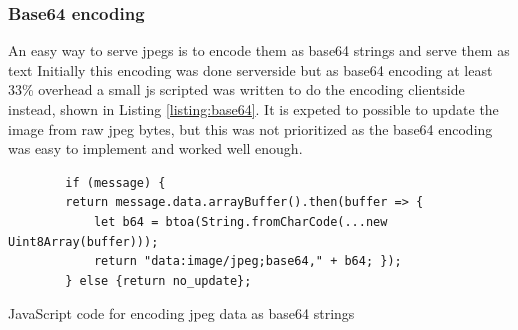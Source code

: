 \subsubsection{Base64 encoding}
An easy way to serve \glspl{jpeg} is to encode them as base64 strings and serve them as text \cite{rAnswerHowDisplay2013}
Initially this encoding was done serverside but as base64 encoding at least 33\% overhead a small \gls{js} scripted was written to do the encoding clientside instead, shown in Listing \ref{listing:base64}.
It is expeted to possible to update the image from raw \gls{jpeg} bytes, but this was not prioritized as the base64 encoding was easy to implement and worked well enough.
\begin{listing}[H]
    \begin{verbatim}
        if (message) {
        return message.data.arrayBuffer().then(buffer => {
            let b64 = btoa(String.fromCharCode(...new Uint8Array(buffer)));
            return "data:image/jpeg;base64," + b64; });
        } else {return no_update};
    \end{verbatim}
    \caption{JavaScript code for encoding \gls{jpeg} data as base64 strings}
    \label{listing:base64}
\end{listing}



